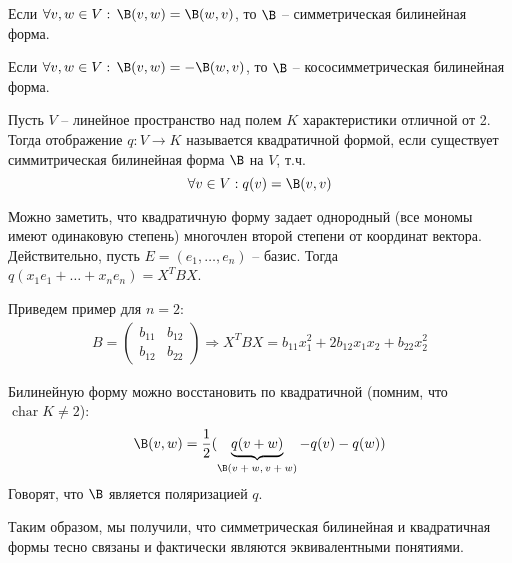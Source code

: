 \begin{conj}
    Если $\forall v, w \in V: \, \B(v, w) = \B(w, v)$, то 
    $\B$ -- симметрическая билинейная форма.
\end{conj}

\begin{conj}
    Если $\forall v, w \in V: \, \B(v, w) = -\B(w, v)$, то 
    $\B$ -- кососимметрическая билинейная форма.
\end{conj}

\begin{conj}
    Пусть $V$ -- линейное пространство над полем $K$ характеристики отличной от 2.
    Тогда отображение $q: V \to K$ называется квадратичной формой,
    если существует симмитрическая билинейная форма $\B$ на $V$, т.ч.
    \[ \forall v \in V: q(v) = \B(v, v) \]
\end{conj}

Можно заметить, что квадратичную форму задает однородный (все мономы имеют одинаковую степень) многочлен второй степени от координат вектора.
Действительно, пусть $E = (e_1, \dots, e_n)$ -- базис.
Тогда $q(x_1e_1 + \dots + x_ne_n) = X^TBX$.

Приведем пример для $n = 2$: \begin{gather*}
    B = \left(\begin{array}{cc}
        b_{11} & b_{12} \\ 
        b_{12} & b_{22}
        \end{array}\right) \Rightarrow X^TBX = b_{11}x^2_1 + 2b_{12}x_1x_2 + b_{22}x^2_2
\end{gather*}

Билинейную форму можно восстановить по квадратичной (помним, что $\operatorname{char} K \neq 2$):
$$
    \B(v, w) = \frac{1}{2}(
        \underbrace{q(v + w)}_{\text{$\B(v + w, v + w)$}} - q(v) - q(w)
        )
$$
Говорят, что $\B$ является поляризацией $q$.

Таким образом, мы получили, что симметрическая билинейная и квадратичная формы тесно связаны и фактически являются эквивалентными понятиями.